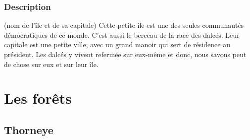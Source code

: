 \subsubsection{Description}
\hypertarget{rinam}{}(nom de l’île et de sa capitale) Cette petite ile est une des seules communautés démocratiques de ce monde.
C'est aussi le berceau de la race des dalcés.
Leur capitale est une petite ville, avec un grand manoir qui sert de résidence au président.
Les dalcés y vivent refermée sur eux-même et donc, nous savons peut de chose sur eux et sur leur île.
\section{Les forêts}
\subsection{Thorneye}
